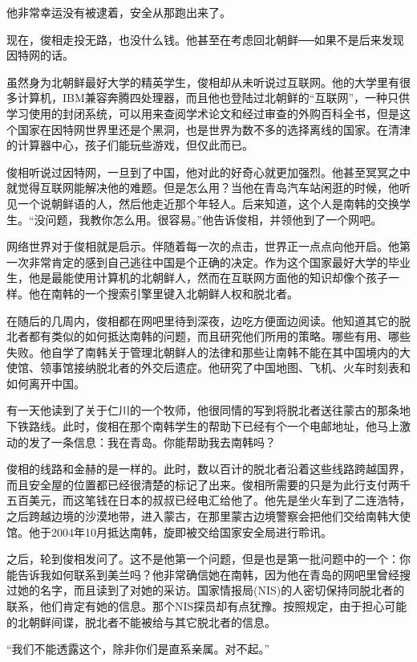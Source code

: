 他非常幸运没有被逮着，安全从那跑出来了。

现在，俊相走投无路，也没什么钱。他甚至在考虑回北朝鲜──如果不是后来发现因特网的话。

虽然身为北朝鲜最好大学的精英学生，俊相却从未听说过互联网。他的大学里有很多计算机，IBM兼容奔腾四处理器，而且他也登陆过北朝鲜的“互联网”，一种只供学习使用的封闭系统，可以用来查阅学术论文和经过审查的外购百科全书，但是这个国家在因特网世界里还是个黑洞，也是世界为数不多的选择离线的国家。在清津的计算器中心，孩子们能玩些游戏，但仅此而已。

俊相听说过因特网，一旦到了中国，他对此的好奇心就更加强烈。他甚至冥冥之中就觉得互联网能解决他的难题。但是怎么用？当他在青岛汽车站闲逛的时候，他听见一个说朝鲜语的人，然后他走近那个年轻人。后来知道，这个人是南韩的交换学生。“没问题，我教你怎么用。很容易。”他告诉俊相，并领他到了一个网吧。

网络世界对于俊相就是启示。伴随着每一次的点击，世界正一点点向他开启。他第一次非常肯定的感到自己逃往中国是个正确的决定。作为这个国家最好大学的毕业生，他是最能使用计算机的北朝鲜人，然而在互联网方面他的知识却像个孩子一样。他在南韩的一个搜索引擎里键入北朝鲜人权和脱北者。

在随后的几周内，俊相都在网吧里待到深夜，边吃方便面边阅读。他知道其它的脱北者都有类似的如何抵达南韩的问题，而且研究他们所用的策略。哪些有用、哪些失败。他自学了南韩关于管理北朝鲜人的法律和那些让南韩不能在其中国境内的大使馆、领事馆接纳脱北者的外交后遗症。他研究了中国地图、飞机、火车时刻表和如何离开中国。

有一天他读到了关于仁川的一个牧师，他很同情的写到将脱北者送往蒙古的那条地下铁路线。此时，俊相在那个南韩学生的帮助下已经有个一个电邮地址，他马上激动的发了一条信息：我在青岛。你能帮助我去南韩吗？

俊相的线路和金赫的是一样的。此时，数以百计的脱北者沿着这些线路跨越国界，而且安全屋的位置都已经很清楚的标记了出来。俊相所需要的只是为此行支付两千五百美元，而这笔钱在日本的叔叔已经电汇给他了。他先是坐火车到了二连浩特，之后跨越边境的沙漠地带，进入蒙古，在那里蒙古边境警察会把他们交给南韩大使馆。他于2004年10月抵达南韩，旋即被交给国家安全局进行聆讯。

之后，轮到俊相发问了。这不是他第一个问题，但是也是第一批问题中的一个：你能告诉我如何联系到美兰吗？他非常确信她在南韩，因为他在青岛的网吧里曾经搜过她的名字，而且读到了对她的采访。国家情报局(NIS)的人密切保持同脱北者的联系，他们肯定有她的信息。那个NIS探员却有点犹豫。按照规定，由于担心可能的北朝鲜间谍，脱北者不能被给与其它脱北者的信息。

“我们不能透露这个，除非你们是直系亲属。对不起。”

